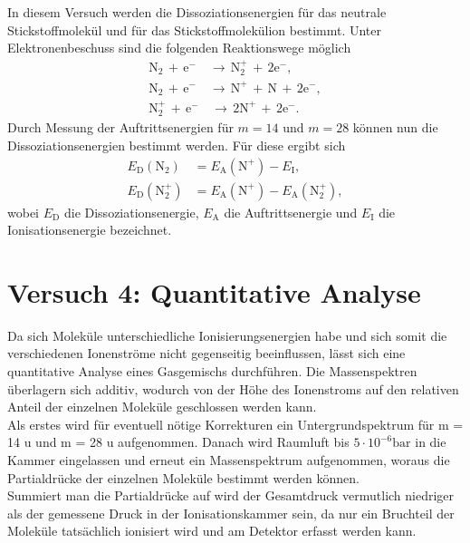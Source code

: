 In diesem Versuch werden die Dissoziationsenergien für das neutrale Stickstoffmolekül und für das Stickstoffmolekülion bestimmt. Unter Elektronenbeschuss sind die folgenden Reaktionswege möglich
\begin{align}
 \textrm{N}_{2} \, + \, \textrm{e}^{-} \, &\to \, \textrm{N}_{2}^{+} \, + \, 2\textrm{e}^{-}, \\
 \textrm{N}_{2} \, + \, \textrm{e}^{-} \, &\to \, \textrm{N}^{+} \, + \, \textrm{N} \, + \, 2\textrm{e}^{-}, \\
 \textrm{N}_{2}^{+} \, + \, \textrm{e}^{-} &\, \to \, 2\textrm{N}^{+} \, + \, 2\textrm{e}^{-}.
\end{align}
Durch Messung der Auftrittsenergien für $m=14$ und $m=28$ können nun die Dissoziationsenergien bestimmt werden. Für diese ergibt sich
\begin{align*}
 E_{\textrm{D}}(\textrm{N}_{2}) &= E_{\textrm{A}}(\textrm{N}^{+}) - E_{\textrm{I}}, \\
 E_{\textrm{D}}(\textrm{N}_{2}^{+}) &= E_{\textrm{A}}(\textrm{N}^{+}) - E_{\textrm{A}}(\textrm{N}_{2}^{+}),
\end{align*}
wobei $E_{\textrm{D}}$ die Dissoziationsenergie, $E_{\textrm{A}}$ die Auftrittsenergie und $E_{\textrm{I}}$ die Ionisationsenergie bezeichnet.




\section{Versuch 4: Quantitative Analyse}

Da sich Moleküle unterschiedliche Ionisierungsenergien habe und sich somit die verschiedenen Ionenströme nicht gegenseitig beeinflussen, lässt sich eine 
quantitative Analyse eines Gasgemischs durchführen. Die Massenspektren überlagern
sich additiv, wodurch von der Höhe des Ionenstroms auf den relativen Anteil der einzelnen Moleküle geschlossen werden kann.\\
Als erstes wird für eventuell nötige Korrekturen ein Untergrundspektrum für m = 14 u und m = 28 u aufgenommen.
Danach wird Raumluft bis $5\cdot10^{-6} \si{\bar}$ in die Kammer eingelassen und erneut ein Massenspektrum aufgenommen, woraus die Partialdrücke der einzelnen Moleküle bestimmt werden können.\\
Summiert man die Partialdrücke auf wird der Gesamtdruck vermutlich niedriger als der gemessene Druck in der Ionisationskammer sein, da nur ein Bruchteil der Moleküle tatsächlich ionisiert wird und am Detektor erfasst werden kann.

